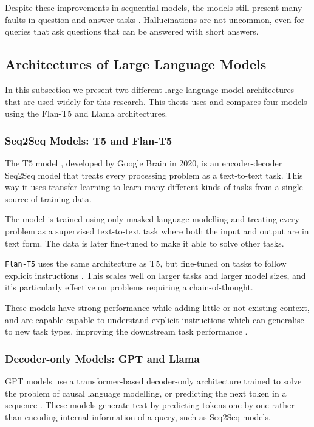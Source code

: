 Despite these improvements in sequential models, the models still present many faults in question-and-answer tasks \citep{how_can_we_know}.
Hallucinations are not uncommon, even for queries that ask questions that can be answered with short answers.

\subsection{Architectures of Large Language Models}
\label{llm_architectures}

In this subsection we present two different large language model architectures that are used widely for this research.
This thesis uses and compares four models using the Flan-T5 and Llama architectures.

\subsubsection{Seq2Seq Models: T5 and Flan-T5}

The T5 model \citep{t5}, developed by Google Brain in 2020, is an encoder-decoder Seq2Seq model that treats every processing problem as a text-to-text task.
This way it uses transfer learning to learn many different kinds of tasks from a single source of training data.

The model is trained using only masked language modelling and treating every problem as a supervised text-to-text task where both the input and output are in text form.
The data is later fine-tuned to make it able to solve other tasks.

\texttt{Flan-T5} uses the same architecture as T5, but fine-tuned on tasks to follow explicit instructions \citep{flant5}.
This scales well on larger tasks and larger model sizes, and it's particularly effective on problems requiring a chain-of-thought.

These models have strong performance while adding little or not existing context, and are capable capable to understand explicit instructions which can generalise to new task types, improving the downstream task performance \citep{flan_performance}.

\subsubsection{Decoder-only Models: GPT and Llama}

GPT models use a transformer-based decoder-only architecture trained to solve the problem of causal language modelling, or predicting the next token in a sequence \cite{gpt,gpt2,gpt3}.
These models generate text by predicting tokens one-by-one rather than encoding internal information of a query, such as Seq2Seq models.

